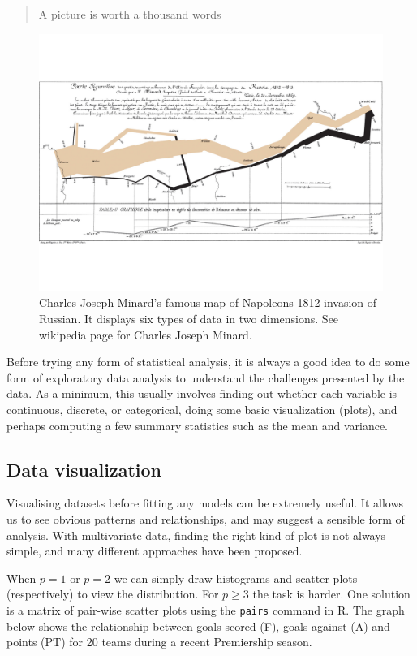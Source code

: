 \documentclass[
]{book}
\theoremstyle{definition}
\theoremstyle{definition}
\theoremstyle{definition}
\theoremstyle{definition}
\theoremstyle{remark}
\begin{document}
\begin{quote}
A picture is worth a thousand words
\end{quote}

\begin{figure}
\includegraphics[width=1\linewidth]{figs/Minard} \caption{Charles Joseph Minard's famous map of Napoleons 1812 invasion of Russian. It displays six types of data in two dimensions. See wikipedia page for Charles Joseph Minard.}\label{fig:unnamed-chunk-5}
\end{figure}

Before trying any form of statistical analysis, it is always a good idea to do some form of exploratory data analysis to understand the challenges presented by the data. As a minimum, this usually involves finding out whether each variable is continuous, discrete, or categorical, doing some basic visualization (plots), and perhaps computing a few summary statistics such as the mean and variance.

\hypertarget{data-visualization}{%
\subsection{Data visualization}\label{data-visualization}}

Visualising datasets before fitting any models can be extremely useful. It allows us to see obvious patterns and relationships, and may suggest a sensible form of analysis.
With multivariate data, finding the right kind of plot is not always simple, and many different approaches have been proposed.

When \(p=1\) or \(p=2\) we can simply draw histograms and scatter plots (respectively) to view the distribution. For \(p \geq 3\) the task is harder. One solution is a matrix of pair-wise scatter plots using the \texttt{pairs} command in R. The graph below shows the relationship between goals scored (F), goals against (A) and points (PT) for 20 teams during a recent Premiership season.
\end{document}
